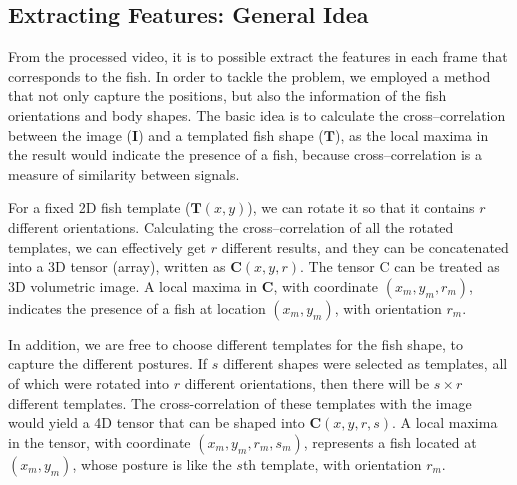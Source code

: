 \documentclass[11pt,twoside]{report}
\begin{document}
\subsection{Extracting Features: General Idea}
\label{section:oishi}

From the processed video, it is to possible extract the features
in each frame that corresponds to the fish. In order to tackle the problem, we employed a method that not only capture the positions, but also the information of the fish orientations and body shapes. The basic idea is to calculate the cross--correlation between the image ($\mathbf{I}$) and a templated fish shape ($\mathbf{T}$), as the local maxima in the result would indicate the presence of a fish, because cross--correlation is a measure of similarity between signals.

For a fixed 2D fish template ($\mathbf{T}(x, y)$), we can rotate it so that it contains $r$ different orientations. Calculating the cross--correlation of all the rotated templates, we can effectively get $r$ different results, and they can be concatenated into a 3D tensor (array), written as $\mathbf{C}(x, y, r)$. The tensor $\mathrm{C}$ can be treated as 3D volumetric image. A local maxima in $\mathbf{C}$, with coordinate $(x_m, y_m, r_m)$, indicates the presence of a fish at location $(x_m, y_m)$, with orientation $r_m$.


In addition, we are free to choose different templates for the fish shape, to capture the different postures. If $s$ different shapes were selected as templates, all of which were rotated into $r$ different orientations, then there will be $s \times r$ different templates. The cross-correlation of these templates with the image would yield a 4D tensor that can be shaped into $\mathbf{C}(x, y, r, s)$. A local maxima in the tensor, with coordinate $(x_m, y_m, r_m, s_m)$, represents a fish located at $(x_m, y_m)$, whose posture is like the $s$th template, with orientation $r_m$.
\end{document}
